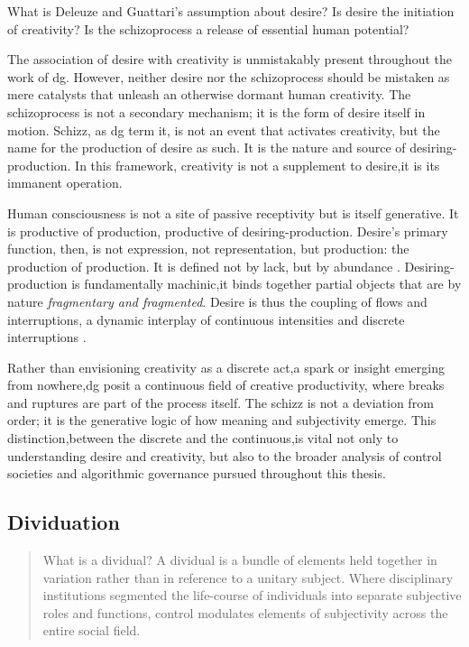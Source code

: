 \begin{orangebox}
	What is Deleuze and Guattari’s assumption about desire? Is desire the initiation of creativity? Is the schizoprocess a release of essential human potential?

	The association of desire with creativity is unmistakably present throughout the work of \gls{dg}. However, neither desire nor the schizoprocess should be mistaken as mere catalysts that unleash an otherwise dormant human creativity. The schizoprocess is not a secondary mechanism; it is the form of desire itself in motion. Schizz, as \gls{dg} term it, is not an event that activates creativity, but the name for the production of desire as such. It is the nature and source of desiring-production. In this framework, creativity is not a supplement to desire,it is its immanent operation.

	Human consciousness is not a site of passive receptivity but is itself generative. It is productive of production, productive of desiring-production. Desire's primary function, then, is not expression, not representation, but production: the production of production. It is defined not by lack, but by abundance \parencite[49]{buchanan2008e}. Desiring-production is fundamentally machinic,it binds together partial objects that are by nature \textit{fragmentary and fragmented}. Desire is thus the coupling of flows and interruptions, a dynamic interplay of continuous intensities and discrete interruptions \parencite[5]{deleuze1983}.

	Rather than envisioning creativity as a discrete act,a spark or insight emerging from nowhere,\gls{dg} posit a continuous field of creative productivity, where breaks and ruptures are part of the process itself. The schizz is not a deviation from order; it is the generative logic of how meaning and subjectivity emerge. This distinction,between the discrete and the continuous,is vital not only to understanding desire and creativity, but also to the broader analysis of control societies and algorithmic governance pursued throughout this thesis.
\end{orangebox}



\subsection{Dividuation}
\begin{quote}
	What is a dividual? A dividual is a bundle of elements held together in variation  rather than in reference to a unitary subject. Where disciplinary institutions  segmented the life-course of individuals into separate subjective roles and  functions, control modulates elements of subjectivity across the entire social field.
	\parencite[5]{mackenzie2021}
\end{quote}


